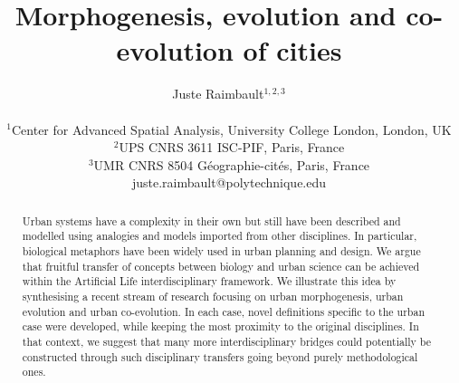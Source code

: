 \documentclass[letterpaper]{article}
\title{Morphogenesis, evolution and co-evolution of cities}
\author{Juste Raimbault$^{1,2,3}$\\
\mbox{}\\
$^1$Center for Advanced Spatial Analysis, University College London, London, UK\\
$^2$UPS CNRS 3611 ISC-PIF, Paris, France\\
$^3$UMR CNRS 8504 G{\'e}ographie-cit{\'e}s, Paris, France\\
juste.raimbault@polytechnique.edu} %
\begin{document}
\maketitle

\begin{abstract}
  Urban systems have a complexity in their own but still have been described and modelled using analogies and models imported from other disciplines. In particular, biological metaphors have been widely used in urban planning and design. We argue that fruitful transfer of concepts between biology and urban science can be achieved within the Artificial Life interdisciplinary framework. We illustrate this idea by synthesising a recent stream of research focusing on urban morphogenesis, urban evolution and urban co-evolution. In each case, novel definitions specific to the urban case were developed, while keeping the most proximity to the original disciplines. In that context, we suggest that many more interdisciplinary bridges could potentially be constructed through such disciplinary transfers going beyond purely methodological ones.
\end{abstract}

\end{document}
